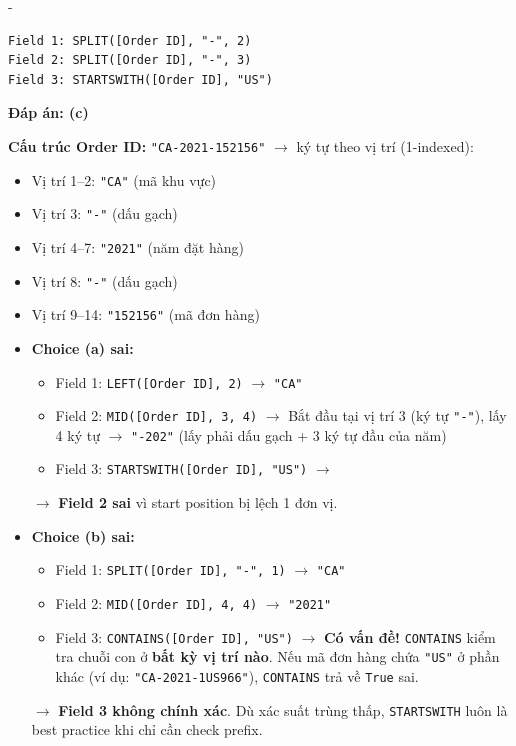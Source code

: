 \documentclass[12pt]{article}
\newcounter{choice}
\renewcommand\thechoice{($\alph{choice}$)}
\newcommand\choicelabel{\thechoice}
\newenvironment{choices}%
  {\list{\choicelabel}%
     {\usecounter{choice}\def\makelabel##1{\hss\llap{##1}}%
       \settowidth{\leftmargin}{W.\hskip\labelsep\hskip 0 em}%
       \def\choice{%
         \item
       } %
       \labelwidth\leftmargin\advance\labelwidth-\labelsep
       \topsep=0pt
       \partopsep=0pt
     }%
  }%
  {\endlist}
\begin{document}
\begin{enumerate}[label=\textbf{Câu \arabic*.}, leftmargin=*, labelsep=1em, itemsep=2em]
\begin{choices}
    \choice
    \begin{lstlisting}[style=tableau]
Field 1: SPLIT([Order ID], "-", 2)
Field 2: SPLIT([Order ID], "-", 3)
Field 3: STARTSWITH([Order ID], "US")
    \end{lstlisting}
\end{choices}

\textbf{Đáp án: (c)}

\begin{guidelinebox}

\textbf{Cấu trúc Order ID:} \texttt{"CA-2021-152156"} $\rightarrow$ ký tự theo vị trí (1-indexed):
\begin{itemize}
    \item Vị trí 1--2: \texttt{"CA"} (mã khu vực)
    \item Vị trí 3: \texttt{"-"} (dấu gạch)
    \item Vị trí 4--7: \texttt{"2021"} (năm đặt hàng)
    \item Vị trí 8: \texttt{"-"} (dấu gạch)
    \item Vị trí 9--14: \texttt{"152156"} (mã đơn hàng)
\end{itemize}

\begin{itemize}
    \item \textbf{Choice (a) sai:}
    \begin{itemize}
        \item Field 1: \texttt{LEFT([Order ID], 2)} $\rightarrow$ \texttt{"CA"} \checkmark
        \item Field 2: \texttt{MID([Order ID], 3, 4)} $\rightarrow$ Bắt đầu tại vị trí 3 (ký tự \texttt{"-"}), lấy 4 ký tự $\rightarrow$ \texttt{"-202"}  (lấy phải dấu gạch + 3 ký tự đầu của năm)
        \item Field 3: \texttt{STARTSWITH([Order ID], "US")} $\rightarrow$ \checkmark
    \end{itemize}
    $\rightarrow$ \textbf{Field 2 sai} vì start position bị lệch 1 đơn vị.

    \item \textbf{Choice (b) sai:}
    \begin{itemize}
        \item Field 1: \texttt{SPLIT([Order ID], "-", 1)} $\rightarrow$ \texttt{"CA"} \checkmark
        \item Field 2: \texttt{MID([Order ID], 4, 4)} $\rightarrow$ \texttt{"2021"} \checkmark
        \item Field 3: \texttt{CONTAINS([Order ID], "US")} $\rightarrow$ \textbf{Có vấn đề!} \texttt{CONTAINS} kiểm tra chuỗi con ở \textbf{bất kỳ vị trí nào}. Nếu mã đơn hàng chứa \texttt{"US"} ở phần khác (ví dụ: \texttt{"CA-2021-1US966"}), \texttt{CONTAINS} trả về \texttt{True} sai.
    \end{itemize}
    $\rightarrow$ \textbf{Field 3 không chính xác}. Dù xác suất trùng thấp, \texttt{STARTSWITH} luôn là best practice khi chỉ cần check prefix.


\end{itemize}
\end{guidelinebox}
\end{enumerate}
\end{document}
